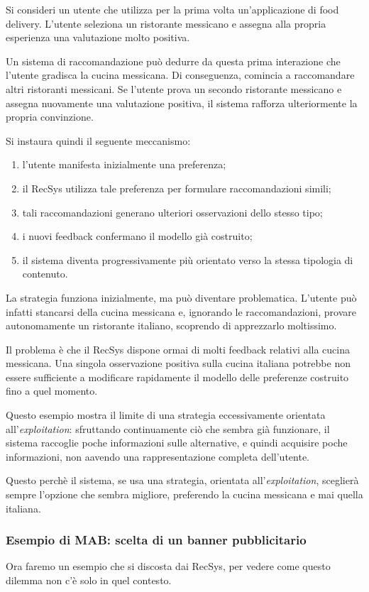 Si consideri un utente che utilizza per la prima volta un'applicazione di food delivery. L'utente seleziona un ristorante messicano e assegna alla propria esperienza una valutazione molto positiva.

Un sistema di raccomandazione può dedurre da questa prima interazione che l'utente gradisca la cucina messicana. Di conseguenza, comincia a raccomandare altri ristoranti messicani. Se l'utente prova un secondo ristorante messicano e assegna nuovamente una valutazione positiva, il sistema rafforza ulteriormente la propria convinzione.


Si instaura quindi il seguente meccanismo:
\begin{enumerate}
    \item l'utente manifesta inizialmente una preferenza;
    \item il RecSys utilizza tale preferenza per formulare raccomandazioni simili;
    \item tali raccomandazioni generano ulteriori osservazioni dello stesso tipo;
    \item i nuovi feedback confermano il modello già costruito;
    \item il sistema diventa progressivamente più orientato verso la stessa tipologia di contenuto.
\end{enumerate}

La strategia funziona inizialmente, ma può diventare problematica. L'utente può infatti stancarsi della cucina messicana e, ignorando le raccomandazioni, provare autonomamente un ristorante italiano, scoprendo di apprezzarlo moltissimo.

Il problema è che il RecSys dispone ormai di molti feedback relativi alla cucina messicana. Una singola osservazione positiva sulla cucina italiana potrebbe non essere sufficiente a modificare rapidamente il modello delle preferenze costruito fino a quel momento.

Questo esempio mostra il limite di una strategia eccessivamente orientata all'\emph{exploitation}: sfruttando continuamente ciò che sembra già funzionare, il sistema raccoglie poche informazioni sulle alternative, e quindi acquisire poche informazioni, non aavendo una rappresentazione completa dell'utente.

Questo perchè il sistema, se usa una strategia, orientata all'\emph{exploitation}, sceglierà sempre l'opzione che sembra migliore, preferendo la cucina messicana e mai quella italiana.


\subsubsection{Esempio di MAB: scelta di un banner pubblicitario}
Ora faremo un esempio che si discosta dai RecSys, per vedere come questo dilemma non c'è solo in quel contesto.


